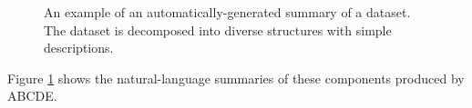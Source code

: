 \documentclass[letterpaper]{article}
\newcommand{\procedurename}{ABCDE}
\begin{document}
\begin{figure}[h]
\centering
{}
\caption{
An example of an automatically-generated summary of a dataset.  The dataset is decomposed into diverse structures with simple descriptions.}
\label{fig:exec}
\end{figure}
Figure \ref{fig:exec} shows the natural-language summaries of these components produced by \procedurename{}.
%
%
\end{document}

